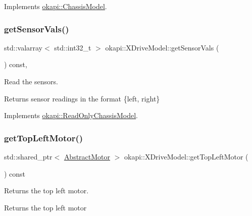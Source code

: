 Implements \mbox{\hyperlink{classokapi_1_1ChassisModel_a3ced2121524ae523592db64733c69472}{okapi\+::\+Chassis\+Model}}.

\mbox{\label{classokapi_1_1XDriveModel_a3beef170f1e7fd988d815f335cafad1e}} 
\subsubsection{\texorpdfstring{getSensorVals()}{getSensorVals()}}
{\footnotesize\ttfamily std\+::valarray$<$ std\+::int32\+\_\+t $>$ okapi\+::\+X\+Drive\+Model\+::get\+Sensor\+Vals (\begin{DoxyParamCaption}{ }\end{DoxyParamCaption}) const\hspace{0.3cm}{\ttfamily [override]}, {\ttfamily [virtual]}}

Read the sensors.

\begin{DoxyReturn}{Returns}
sensor readings in the format \{left, right\} 
\end{DoxyReturn}


Implements \mbox{\hyperlink{classokapi_1_1ReadOnlyChassisModel_af2d844d9e12bb7c778ac9a5a0074f848}{okapi\+::\+Read\+Only\+Chassis\+Model}}.

\mbox{\label{classokapi_1_1XDriveModel_a6ffd50946ef2655b3d8c74c0d211101b}} 
\subsubsection{\texorpdfstring{getTopLeftMotor()}{getTopLeftMotor()}}
{\footnotesize\ttfamily std\+::shared\+\_\+ptr$<$ \mbox{\hyperlink{classokapi_1_1AbstractMotor}{Abstract\+Motor}} $>$ okapi\+::\+X\+Drive\+Model\+::get\+Top\+Left\+Motor (\begin{DoxyParamCaption}{ }\end{DoxyParamCaption}) const}

Returns the top left motor.

\begin{DoxyReturn}{Returns}
the top left motor 
\end{DoxyReturn}
\mbox{\label{classokapi_1_1XDriveModel_abd08edca41aa963c15fafc4b735c0e8d}} 
